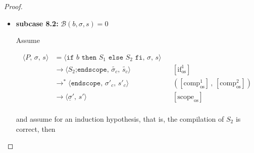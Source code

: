 \documentclass{article}
\begin{document}
\begin{proof}
\begin{itemize}
\begin{itemize}
        \item \textbf{subcase 8.2:} $\mathcal{B}(b, \sigma, s) = 0$

            Assume

                \[
                  \begin{aligned}
                  \langle P,\, \sigma,\, s \rangle
                  &=\langle \texttt{if } b \texttt{ then } S_1 \texttt{ else } S_2 \texttt{ fi},\, \sigma,\, s \rangle \\
                  &\rightarrow \langle S_2\texttt{;endscope},\, \tilde{\sigma_c} ,\, \tilde{s_c} \rangle
                  && [\text{if}^1_{\text{os}}]   \\
                  &\rightarrow^\ast \langle \texttt{endscope},\, \sigma'_c ,\, s'_c \rangle 
                  && ([\text{comp}^1_{\text{os}}] \,,\, [\text{comp}^2_{\text{os}}])   \\
                  &\rightarrow \langle \underline{\sigma}' ,\, s' \rangle
                  && [\text{scope}_{\text{os}}]   \\
                  \end{aligned}
              \]

            and assume for an induction hypothesis, that is, the compilation of $S_2$ is correct, then


\end{itemize}
\end{itemize}
\end{proof}
\end{document}
